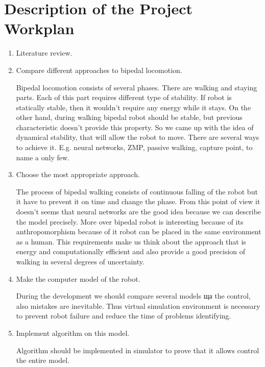 \documentclass[11pt,a4paper]{report}
\begin{document}
\chapter{Description of the Project Workplan}
\begin{enumerate}
	\item
	Literature review.
	\item
	Compare different approaches to bipedal locomotion.
	
	Bipedal locomotion consists of several phases. There are walking and staying parts. Each of this part requires different type of stability. If robot is statically stable, then it wouldn't require any energy while it stays. On the other hand, during walking bipedal robot should be stable, but previous characteristic doesn't provide this property. So we came up with the idea of dynamical stability, that will allow the robot to move. 
	There are several ways to achieve it. E.g. neural networks, ZMP, passive walking, capture point, to name a only few.
	\item
	Choose the most appropriate approach.
	
	The process of bipedal walking consists of continuous falling of the robot but it have to prevent it on time and change the phase. From this point of view it doesn't seems that neural networks are the good idea because we can describe the model precisely. More over bipedal robot is interesting because of its anthropomorphism because of it robot can be placed in the same environment as a human. This requirements make us think about the approach that is energy and computationally efficient and also provide a good precision of walking in several degrees of uncertainty.  
	\item
	Make the computer model of the robot.
	
	During the development we should compare several models ща the control, also mistakes are inevitable. Thus virtual simulation environment is necessary to prevent robot failure and reduce the time of problems identifying.
	\item
	Implement algorithm on this model.
	
	Algorithm should be implemented in simulator to prove that it allows control the entire model.  
\end{enumerate}



  
\end{document}
